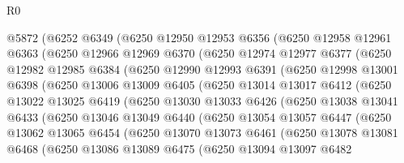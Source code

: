 \begin{lexlean}{R0}
\begin{coremodule}
    @5872
      (@6252
        @6349
        (@6250
          @12950
          @12953
          @6356
          (@6250
            @12958
            @12961
            @6363
            (@6250
              @12966
              @12969
              @6370
              (@6250
                @12974
                @12977
                @6377
                (@6250
                  @12982
                  @12985
                  @6384
                  (@6250
                    @12990
                    @12993
                    @6391
                    (@6250
                      @12998
                      @13001
                      @6398
                      (@6250
                        @13006
                        @13009
                        @6405
                        (@6250
                          @13014
                          @13017
                          @6412
                          (@6250
                            @13022
                            @13025
                            @6419
                            (@6250
                              @13030
                              @13033
                              @6426
                              (@6250
                                @13038
                                @13041
                                @6433
                                (@6250
                                  @13046
                                  @13049
                                  @6440
                                  (@6250
                                    @13054
                                    @13057
                                    @6447
                                    (@6250
                                      @13062
                                      @13065
                                      @6454
                                      (@6250
                                        @13070
                                        @13073
                                        @6461
                                        (@6250
                                          @13078
                                          @13081
                                          @6468
                                          (@6250
                                            @13086
                                            @13089
                                            @6475
                                            (@6250
                                              @13094
                                              @13097
                                              @6482

\end{coremodule}
\end{lexlean}
